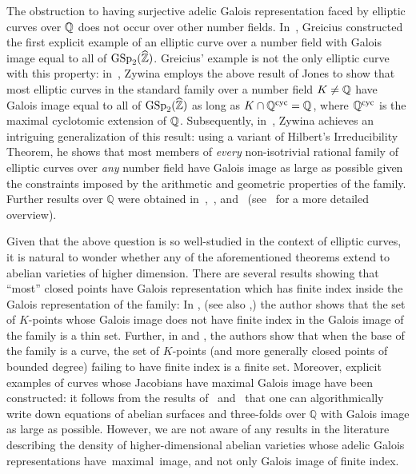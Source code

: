 The obstruction to having surjective adelic Galois representation faced by elliptic curves over $\mathbb Q$ does not occur over other number fields. In~\cite[Theorem 1.5]{greasy}, Greicius constructed the first explicit example of an elliptic curve over a number field with Galois image equal to all of $\operatorname{GSp}_2(\widehat{\mathbb Z})$. Greicius' example is not the only elliptic curve with this property: in~\cite[Theorem 1.2]{zywina2010elliptic}, Zywina employs the above result of Jones to show that most elliptic curves in the standard family over a number field $K \neq \mathbb Q$ have Galois image equal to all of $\operatorname{GSp}_2(\widehat{\mathbb Z})$ as long as $K \cap \mathbb Q^{\operatorname{cyc}} = \mathbb Q$, where $\mathbb Q^{\operatorname{cyc}}$ is the maximal cyclotomic extension of $\mathbb Q$. Subsequently, in~\cite[Theorem 1.15]{zywina2010hilbert}, Zywina achieves an intriguing generalization of this result: using a variant of Hilbert's Irreducibility Theorem, he shows that most members of \emph{every} non-isotrivial rational family of elliptic curves over \emph{any} number field have Galois image as large as possible given the constraints imposed by the arithmetic and geometric properties of the family. Further results over $\mathbb Q$ were
obtained in~\cite{grant:a-formula-for-the-number-of-elliptic-curves-with-exceptional-primes},~\cite{cojocaruH:uniform-results-for-serres-theorem-for-elliptic-curves}, and~\cite{cojocaruGJ:one-parameter-families-of-elliptic-curves}
(see~\cite[p.~6]{zywina2010hilbert} for a more detailed overview).

Given that the above question is so well-studied in the context of elliptic curves, it is natural to wonder whether any of the aforementioned theorems extend to abelian varieties of higher dimension.
There are several results showing that ``most'' closed points
have Galois representation which has finite index inside the Galois representation
of the family:
In \cite{cadoret2015open}, (see also \cite{cadoret2015integral},) the author
shows that the set of $K$-points whose Galois image does not have finite
index in the Galois image of the family is a thin set. Further, in \cite{cadoretuniform-i} and \cite{cadoretuniform-ii},
the authors show that when the base of the family is a curve, the set of $K$-points
(and more generally closed points of bounded degree)
failing to have finite index is a finite set.
Moreover, explicit examples of curves whose Jacobians have maximal Galois image have been constructed: it follows from the results of~\cite{dooleyfat} and~\cite{zywina2010elliptic} that one can algorithmically write down equations of abelian surfaces and three-folds over $\mathbb Q$ with Galois image as large as possible. 
However, we are not aware of any results in the literature describing the density of higher-dimensional abelian varieties whose adelic Galois representations 
\mbox{have maximal image,} and not only Galois image of finite index.


